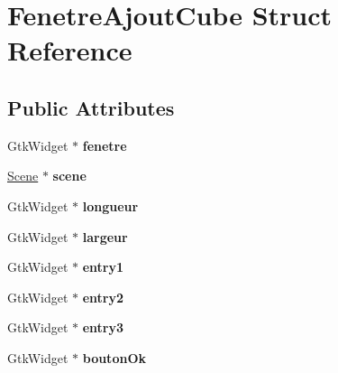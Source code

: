 \hypertarget{structFenetreAjoutCube}{
\section{FenetreAjoutCube Struct Reference}
\label{structFenetreAjoutCube}
}
\subsection*{Public Attributes}
\begin{DoxyCompactItemize}
\item 
\hypertarget{structFenetreAjoutCube_ad03153d4da313a0fe1fbae4c6cee5833}{
GtkWidget $\ast$ {\bfseries fenetre}}
\label{structFenetreAjoutCube_ad03153d4da313a0fe1fbae4c6cee5833}

\item 
\hypertarget{structFenetreAjoutCube_abb37ad83a44c7e8b10c2a1276edb99ce}{
\hyperlink{structScene}{Scene} $\ast$ {\bfseries scene}}
\label{structFenetreAjoutCube_abb37ad83a44c7e8b10c2a1276edb99ce}

\item 
\hypertarget{structFenetreAjoutCube_a7a7eb4c00582702dd1b2a37e1b021fd0}{
GtkWidget $\ast$ {\bfseries longueur}}
\label{structFenetreAjoutCube_a7a7eb4c00582702dd1b2a37e1b021fd0}

\item 
\hypertarget{structFenetreAjoutCube_a4ac23baf66cb3659aaa0366435870bf7}{
GtkWidget $\ast$ {\bfseries largeur}}
\label{structFenetreAjoutCube_a4ac23baf66cb3659aaa0366435870bf7}

\item 
\hypertarget{structFenetreAjoutCube_afd64e5bbc4d03c884aec2dd3fd0fbfa5}{
GtkWidget $\ast$ {\bfseries entry1}}
\label{structFenetreAjoutCube_afd64e5bbc4d03c884aec2dd3fd0fbfa5}

\item 
\hypertarget{structFenetreAjoutCube_a1b8d75de567cc6fead7a58a5f989e69c}{
GtkWidget $\ast$ {\bfseries entry2}}
\label{structFenetreAjoutCube_a1b8d75de567cc6fead7a58a5f989e69c}

\item 
\hypertarget{structFenetreAjoutCube_afe6589a94b46d1f07cd408adf2ca5d8e}{
GtkWidget $\ast$ {\bfseries entry3}}
\label{structFenetreAjoutCube_afe6589a94b46d1f07cd408adf2ca5d8e}

\item 
\hypertarget{structFenetreAjoutCube_a5c100225db2612d395804e2b4a1df864}{
GtkWidget $\ast$ {\bfseries boutonOk}}
\label{structFenetreAjoutCube_a5c100225db2612d395804e2b4a1df864}


\end{DoxyCompactItemize}
